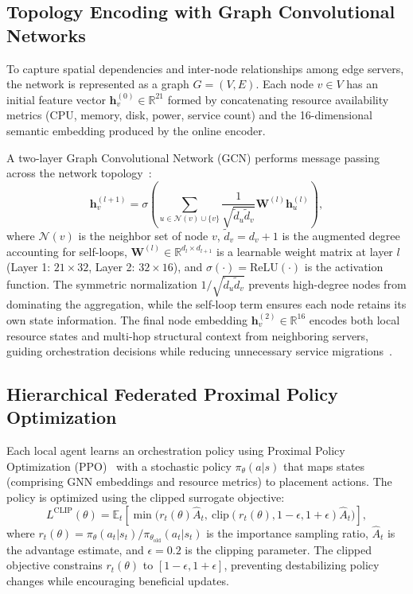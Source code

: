 \documentclass[conference]{IEEEtran}
\begin{document}
	\subsection{Topology Encoding with Graph Convolutional Networks}
	To capture spatial dependencies and inter-node relationships among edge servers, the network is represented as a graph $G = (V, E)$. Each node $v \in V$ has an initial feature vector $\mathbf{h}_v^{(0)} \in \mathbb{R}^{21}$ formed by concatenating resource availability metrics (CPU, memory, disk, power, service count) and the 16-dimensional semantic embedding produced by the online encoder.
	
	A two-layer Graph Convolutional Network (GCN) performs message passing across the network topology~\cite{wang2024deepgrl}:
	\begin{equation}
		\mathbf{h}_v^{(l+1)} = \sigma\!\left(\sum_{u \in \mathcal{N}(v) \cup \{v\}} \frac{1}{\sqrt{\tilde{d}_u \tilde{d}_v}} \mathbf{W}^{(l)} \mathbf{h}_u^{(l)}\right),
	\end{equation}
	where $\mathcal{N}(v)$ is the neighbor set of node $v$, $\tilde{d}_v = d_v + 1$ is the augmented degree accounting for self-loops, $\mathbf{W}^{(l)} \in \mathbb{R}^{d_l \times d_{l+1}}$ is a learnable weight matrix at layer $l$ (Layer 1: $21 \times 32$, Layer 2: $32 \times 16$), and $\sigma(\cdot) = \text{ReLU}(\cdot)$ is the activation function. The symmetric normalization $1/\sqrt{\tilde{d}_u \tilde{d}_v}$ prevents high-degree nodes from dominating the aggregation, while the self-loop term ensures each node retains its own state information. The final node embedding $\mathbf{h}_v^{(2)} \in \mathbb{R}^{16}$ encodes both local resource states and multi-hop structural context from neighboring servers, guiding orchestration decisions while reducing unnecessary service migrations~\cite{moreira2024vne}.
	
	
	\subsection{Hierarchical Federated Proximal Policy Optimization}
	Each local agent learns an orchestration policy using Proximal Policy Optimization (PPO)~\cite{robles2023multilayer} with a stochastic policy $\pi_{\theta}(a|s)$ that maps states (comprising GNN embeddings and resource metrics) to placement actions. The policy is optimized using the clipped surrogate objective:
	\begin{equation}
		L^{\text{CLIP}}(\theta) = \mathbb{E}_t\!\left[\min\!\big(r_t(\theta)\hat{A}_t, \ \text{clip}(r_t(\theta), 1-\epsilon, 1+\epsilon)\hat{A}_t\big)\right],
	\end{equation}
	where $r_t(\theta) = \pi_\theta(a_t|s_t)/\pi_{\theta_{\text{old}}}(a_t|s_t)$ is the importance sampling ratio, $\hat{A}_t$ is the advantage estimate, and $\epsilon = 0.2$ is the clipping parameter. The clipped objective constrains $r_t(\theta)$ to $[1-\epsilon, 1+\epsilon]$, preventing destabilizing policy changes while encouraging beneficial updates.
	
\end{document}
